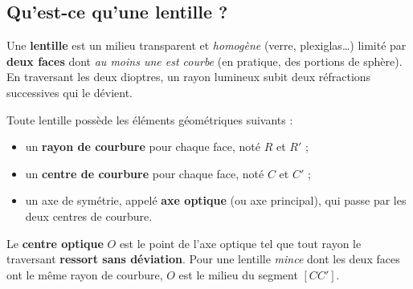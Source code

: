 \documentclass[11pt,a4paper]{article}
\begin{document}
\subsection{Qu'est-ce qu'une lentille ?}

\begin{definition}[lentille]
Une \textbf{lentille} est un milieu transparent et \emph{homogène} (verre, plexiglas\ldots) limité par
\textbf{deux faces} dont \emph{au moins une est courbe} (en pratique, des portions de sphère). En
traversant les deux dioptres, un rayon lumineux subit deux réfractions successives qui le dévient.
\end{definition}

Toute lentille possède les éléments géométriques suivants :
\begin{itemize}[leftmargin=1.7em,topsep=2pt,itemsep=1pt]
  \item un \textbf{rayon de courbure} pour chaque face, noté $R$ et $R'$ ;
  \item un \textbf{centre de courbure} pour chaque face, noté $C$ et $C'$ ;
  \item un \boldmath{}axe de symétrie\unboldmath{}, appelé \textbf{axe optique} (ou axe principal),
        qui passe par les deux centres de courbure.
\end{itemize}

\begin{definition}
Le \textbf{centre optique} $O$ est le point de l'axe optique tel que tout rayon le traversant
\textbf{ressort sans déviation}. Pour une lentille \emph{mince} dont les deux faces ont le même rayon
de courbure, $O$ est le milieu du segment $[CC']$.
\end{definition}
\end{document}

